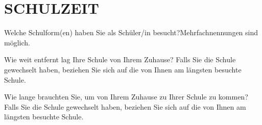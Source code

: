 
\section{\uppercase{Schulzeit}}
\vspace{.25cm}

\begin{choicequestion}[1]{Welche Schulform(en) haben Sie als Schüler/in besucht?\newline\footnotesize{Mehrfachnennungen sind möglich.}}
\end{choicequestion}

\vspace{-.15cm}
\separate
\vspace{-.15cm}

\begin{choicegroup}{Wie weit entfernt lag Ihre Schule von Ihrem Zuhause?
	\newline\footnotesize Falls Sie die Schule gewechselt haben, beziehen Sie sich auf die von Ihnen am längsten besuchte Schule.}

\end{choicegroup}

\vspace{-.15cm}
\separate
\vspace{-.15cm}

\begin{choicegroup}{Wie lange brauchten Sie, um von Ihrem Zuhause zu Ihrer Schule zu kommen?
	\newline\footnotesize Falls Sie die Schule gewechselt haben, beziehen Sie sich auf die von Ihnen am längsten besuchte Schule.}

\end{choicegroup}

